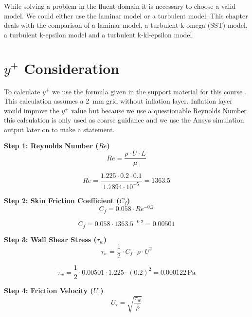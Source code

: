 While solving a problem in the fluent domain it is necessary to choose a valid model. We could either use the laminar model or a turbulent model.
This chapter deals with the comparison of a laminar model, a turbulent k-omega (SST) model, a turbulent k-epsilon model and a turbulent k-kl-epsilon model.

\section{$y^+$ Consideration}

To calculate $y^+$ we use the formula given in the support material for this course \cite{y_plus_calc}. This calculation assumes a \SI{2}{\mm} grid without inflation layer. Inflation layer would improve the $y^+$ value but because we use a questionable Reynolds Number this calculation is only used as coarse guidance and we use the Ansys simulation output later on to make a statement.

\textbf{Step 1: Reynolds Number (\( Re \))}
\begin{equation}
Re = \frac{\rho \cdot U \cdot L}{\mu}
\end{equation}

\begin{equation}
Re = \frac{1.225 \cdot 0.2 \cdot 0.1}{1.7894 \cdot 10^{-5}} = 1363.5
\end{equation}

\textbf{Step 2: Skin Friction Coefficient (\( C_f \))}
\begin{equation}
C_f = 0.058 \cdot Re^{-0.2}
\end{equation}

\begin{equation}
C_f = 0.058 \cdot 1363.5^{-0.2} = 0.00501
\end{equation}

\textbf{Step 3: Wall Shear Stress (\( \tau_w \))}
\begin{equation}
\tau_w = \frac{1}{2} \cdot C_f \cdot \rho \cdot U^2
\end{equation}

\begin{equation}
\tau_w = \frac{1}{2} \cdot 0.00501 \cdot 1.225 \cdot (0.2)^2 = 0.000122 \, \text{Pa}
\end{equation}

\textbf{Step 4: Friction Velocity (\( U_\tau \))}
\begin{equation}
U_\tau = \sqrt{\frac{\tau_w}{\rho}}
\end{equation}


